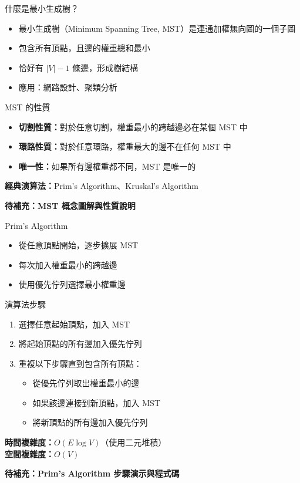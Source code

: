 \documentclass{beamer}
\begin{document}
\begin{frame}{什麼是最小生成樹？}
\begin{itemize}
    \item 最小生成樹（Minimum Spanning Tree, MST）是連通加權無向圖的一個子圖
    \item 包含所有頂點，且邊的權重總和最小
    \item 恰好有 $|V| - 1$ 條邊，形成樹結構
    \item 應用：網路設計、聚類分析
\end{itemize}

\vspace{1em}
\begin{block}{MST 的性質}
\begin{itemize}
    \item \textbf{切割性質：}對於任意切割，權重最小的跨越邊必在某個 MST 中
    \item \textbf{環路性質：}對於任意環路，權重最大的邊不在任何 MST 中
    \item \textbf{唯一性：}如果所有邊權重都不同，MST 是唯一的
\end{itemize}
\end{block}

\vspace{1em}
\textbf{經典演算法：}Prim's Algorithm、Kruskal's Algorithm

\vspace{1em}
\textbf{待補充：MST 概念圖解與性質說明}
\end{frame}

\begin{frame}{Prim's Algorithm}
\begin{itemize}
    \item 從任意頂點開始，逐步擴展 MST
    \item 每次加入權重最小的跨越邊
    \item 使用優先佇列選擇最小權重邊
\end{itemize}

\vspace{1em}
\begin{block}{演算法步驟}
\begin{enumerate}
    \item 選擇任意起始頂點，加入 MST
    \item 將起始頂點的所有邊加入優先佇列
    \item 重複以下步驟直到包含所有頂點：
    \begin{itemize}
        \item 從優先佇列取出權重最小的邊
        \item 如果該邊連接到新頂點，加入 MST
        \item 將新頂點的所有邊加入優先佇列
    \end{itemize}
\end{enumerate}
\end{block}

\vspace{1em}
\textbf{時間複雜度：}$O(E \log V)$（使用二元堆積）\\
\textbf{空間複雜度：}$O(V)$

\vspace{1em}
\textbf{待補充：Prim's Algorithm 步驟演示與程式碼}
\end{frame}
\end{document}
